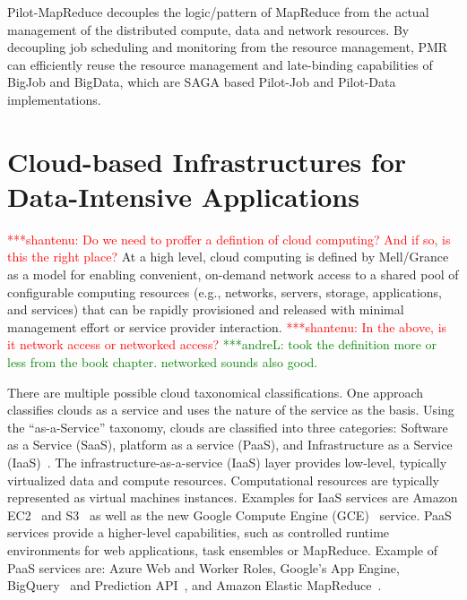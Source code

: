 \documentclass[times]{cpeauth}
\newcommand{\jhanote}[1]{ {\textcolor{red} { ***shantenu: #1 }}}
\newcommand{\alnote}[1]{ {\textcolor{green} { ***andreL: #1 }}}
\newcommand{\alnote}[1]{}
\newcommand{\jhanote}[1]{}
\begin{document}
\begin{itemize}
Pilot-MapReduce decouples the logic/pattern of MapReduce from the actual
management of the distributed compute, data and network resources. By
decoupling job scheduling and monitoring from the resource management, PMR can
efficiently reuse the resource management and late-binding capabilities of
BigJob and BigData, which are SAGA based Pilot-Job and Pilot-Data
implementations.

\end{itemize}


\section{Cloud-based Infrastructures for Data-Intensive Applications}


\jhanote{Do we need to proffer a defintion of cloud computing? And if
  so, is this the right place?} At a high level, cloud computing is
defined by Mell/Grance~\cite{nist_cloud} as a model for enabling
convenient, on-demand network access to a shared pool of configurable
computing resources (e.g., networks, servers, storage, applications,
and services) that can be rapidly provisioned and released with
minimal management effort or service provider interaction.
\jhanote{In the above, is it network access or networked access?}\alnote{took 
the definition more or less from the book chapter. networked sounds also 
good.}


There are multiple possible cloud taxonomical classifications. One
approach classifies clouds as a service and uses the nature of the
service as the basis. Using the ``as-a-Service'' taxonomy, clouds are
classified into three categories: Software as a Service (SaaS),
platform as a service (PaaS), and Infrastructure as a Service
(IaaS)~\cite{Jha:2010kx}. The infrastructure-as-a-service (IaaS) layer
provides low-level, typically virtualized data and compute resources.
Computational resources are typically represented as virtual machines
instances. Examples for IaaS services are Amazon EC2~\cite{amazon_ec2}
and S3~\cite{amazons3} as well as the new Google Compute Engine
(GCE)~\cite{gce} service. PaaS services provide a higher-level
capabilities, such as controlled runtime environments for web
applications, task ensembles or MapReduce.  Example of PaaS services
are: Azure Web and Worker Roles, Google's App Engine,
BigQuery~\cite{google-bigquery} and Prediction
API~\cite{google-predication-api}, and Amazon Elastic
MapReduce~\cite{amazonemr}.
\end{document}
